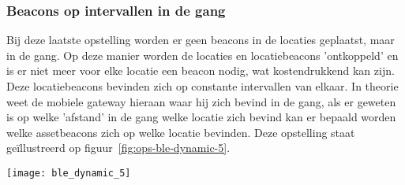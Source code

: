 \subsubsection{Beacons op intervallen in de gang}
\begin{minipage}{0.65\textwidth}
Bij deze laatste opstelling worden er geen beacons in de locaties geplaatst, maar in de gang. Op deze manier worden de locaties en locatiebeacons 'ontkoppeld' en is er niet meer voor elke locatie een beacon nodig, wat kostendrukkend kan zijn. Deze locatiebeacons bevinden zich op constante intervallen van elkaar. In theorie weet de mobiele gateway hieraan waar hij zich bevind in de gang, als er geweten is op welke 'afstand' in de gang welke locatie zich bevind kan er bepaald worden welke assetbeacons zich op welke locatie bevinden. Deze opstelling staat geïllustreerd op figuur~\ref{fig:ops-ble-dynamic-5}.
\end{minipage}
\hfill
\begin{minipage}{0.30\textwidth}
	\texttt{[image: ble\_dynamic\_5]}
	\label{fig:ops-ble-dynamic-5}
\end{minipage}